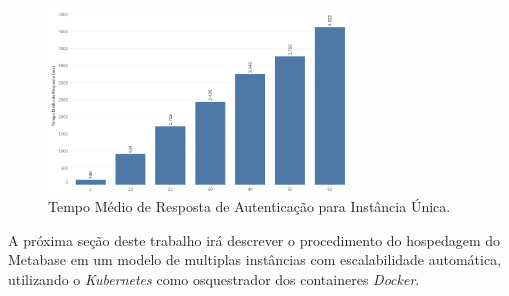 \begin{figure}[htp]
   \centering
    \includegraphics[width=8cm]{Imagens/avg-response-time}
    \caption{Tempo Médio de Resposta de Autenticação para Instância Única.}
    \label{fig.avg-resp-time}
\end{figure} 

A próxima seção deste trabalho irá descrever o procedimento do hospedagem do Metabase em um modelo de multiplas instâncias com escalabilidade automática, utilizando o \textit{Kubernetes} como osquestrador dos containeres \textit{Docker}.

